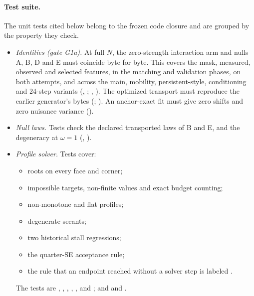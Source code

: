 \paragraph{Test suite.}
The unit tests cited below belong to the frozen code closure and are grouped by the property they check.
\begin{itemize}
\item \emph{Identities (gate G1a).} At full $N$, the zero-strength interaction arm and nulls A, B, D and E must coincide byte for byte. This covers the mask, measured, observed and selected features, in the matching and validation phases, on both attempts, and across the main, mobility, persistent-style, conditioning and 24-step variants (, ; , ). The optimized transport must reproduce the earlier generator's bytes (; ). An anchor-exact fit must give zero shifts and zero nuisance variance ().
\item \emph{Null laws.} Tests check the declared transported laws of B and E, and the degeneracy at $\omega=1$ (, ).
\item \emph{Profile solver.} Tests cover:
  \begin{itemize}
  \item roots on every face and corner;
  \item impossible targets, non-finite values and exact budget counting;
  \item non-monotone and flat profiles;
  \item degenerate secants;
  \item two historical stall regressions;
  \item the quarter-SE acceptance rule;
  \item the rule that an endpoint reached without a solver step is labeled .
  \end{itemize}
  The tests are , , , , ,  and ; and  and .

\end{itemize}
